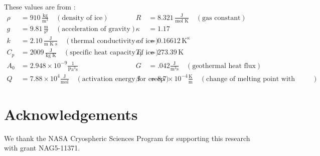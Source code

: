 \documentclass{amsart}%
\theoremstyle{plain}
\theoremstyle{definition}
\theoremstyle{remark}
\newcommand{\ufrac}[2]{\ensuremath{\frac{\text{#1}}{\text{#2}} }}
\begin{document}
These values are from \cite{EISMINT96}: \scriptsize
\begin{align*}
\rho &= 910\, \frac{\text{kg}}{\text{m}^3} \quad(\text{density of ice}) & R &= 8.321\,  \ufrac{J}{mol K} \quad (\text{gas constant})\\
g &= 9.81\, \frac{\text{m}}{\text{s}^2} \quad (\text{acceleration of gravity})& \kappa &= 1.17\\
k &= 2.10\, \frac{\text{J}}{\text{m K s}} \quad (\text{thermal conductivity of ice}) & c &= 0.16612 \, \text{K}^{\kappa} \\
C_p &= 2009\, \ufrac{J}{kg K} \quad (\text{specific heat capacity of ice})& T_r&=273.39\, \text{K} \\
A_0 &= 2.948\times 10^{-9} \frac{1}{\text{Pa}^3 \text{s}} &  G &= .042 \frac{\text{J}}{\text{m}^2\text{s}} \quad (\text{geothermal heat flux}) \\
Q &= 7.88\times 10^4 \ufrac{J}{mol} \quad (\text{activation energy for creep})&  \beta &=8.7\times 10^{-4} \ufrac{K}{m} \quad (\text{change of melting point with depth})
\end{align*}
\normalsize




\section{Acknowledgements}

We thank the NASA Cryospheric Sciences Program for supporting this research with grant NAG5-11371.



\end{document}
